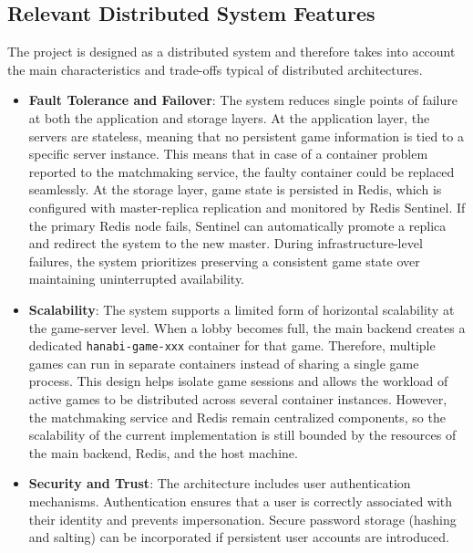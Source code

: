 \documentclass{scrartcl}
\begin{document}
\subsection{Relevant Distributed System Features}
\label{ds-features}

The project is designed as a distributed system and therefore takes into account the main characteristics and trade-offs typical of distributed architectures.

\begin{itemize}

  \item \textbf{Fault Tolerance and Failover}: \newline
  The system reduces single points of failure at both the application and storage layers. 
  At the application layer, the servers are stateless, meaning that no persistent game information is tied to a specific server instance. This means that in case of a container problem reported to the matchmaking service, the faulty container could be replaced seamlessly.
  At the storage layer, game state is persisted in Redis, which is configured with master-replica replication and monitored by Redis Sentinel. 
  If the primary Redis node fails, Sentinel can automatically promote a replica and redirect the system to the new master. 
  During infrastructure-level failures, the system prioritizes preserving a consistent game state over maintaining uninterrupted availability.

  \item \textbf{Scalability}: \newline
  The system supports a limited form of horizontal scalability at the game-server level. When a lobby becomes full, the main backend creates a dedicated \texttt{hanabi-game-xxx} container for that game. Therefore, multiple games can run in separate containers instead of sharing a single game process. This design helps isolate game sessions and allows the workload of active games to be distributed across several container instances. However, the matchmaking service and Redis remain centralized components, so the scalability of the current implementation is still bounded by the resources of the main backend, Redis, and the host machine.

  \item \textbf{Security and Trust}: \newline
  The architecture includes user authentication mechanisms. 
  Authentication ensures that a user is correctly associated with their identity and prevents impersonation. 
  Secure password storage (hashing and salting) can be incorporated if persistent user accounts are introduced. 


\end{itemize}
\end{document}

